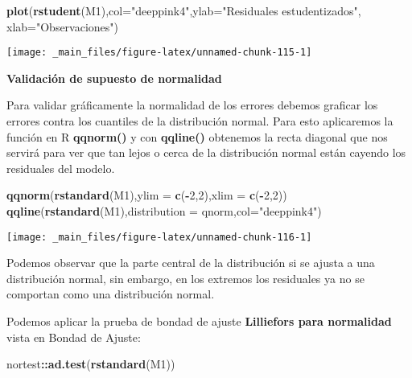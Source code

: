 \documentclass[
  a4paper,
  oneside,
  openany]{book}
\newenvironment{Shaded}{\begin{snugshade}}{\end{snugshade}}
\newcommand{\DataTypeTok}[1]{\textcolor[rgb]{0.13,0.29,0.53}{#1}}
\newcommand{\DecValTok}[1]{\textcolor[rgb]{0.00,0.00,0.81}{#1}}
\newcommand{\KeywordTok}[1]{\textcolor[rgb]{0.13,0.29,0.53}{\textbf{#1}}}
\newcommand{\NormalTok}[1]{#1}
\newcommand{\OperatorTok}[1]{\textcolor[rgb]{0.81,0.36,0.00}{\textbf{#1}}}
\newcommand{\StringTok}[1]{\textcolor[rgb]{0.31,0.60,0.02}{#1}}
\begin{document}
\begin{Shaded}
\begin{Highlighting}[]
\KeywordTok{plot}\NormalTok{(}\KeywordTok{rstudent}\NormalTok{(M1),}\DataTypeTok{col=}\StringTok{"deeppink4"}\NormalTok{,}\DataTypeTok{ylab=}\StringTok{"Residuales estudentizados"}\NormalTok{, }\DataTypeTok{xlab=}\StringTok{"Observaciones"}\NormalTok{)}
\end{Highlighting}
\end{Shaded}

\begin{center}\texttt{[image: \_main\_files/figure-latex/unnamed-chunk-115-1]} \end{center}

\textbf{Validación de supuesto de normalidad}

Para validar gráficamente la normalidad de los errores debemos graficar los errores contra los cuantiles de la distribución normal. Para esto aplicaremos la función en R \textbf{qqnorm()} y con \textbf{qqline()} obtenemos la recta diagonal que nos servirá para ver que tan lejos o cerca de la distribución normal están cayendo los residuales del modelo.

\begin{Shaded}
\begin{Highlighting}[]
\KeywordTok{qqnorm}\NormalTok{(}\KeywordTok{rstandard}\NormalTok{(M1),}\DataTypeTok{ylim =} \KeywordTok{c}\NormalTok{(}\OperatorTok{{-}}\DecValTok{2}\NormalTok{,}\DecValTok{2}\NormalTok{),}\DataTypeTok{xlim =} \KeywordTok{c}\NormalTok{(}\OperatorTok{{-}}\DecValTok{2}\NormalTok{,}\DecValTok{2}\NormalTok{))}
\KeywordTok{qqline}\NormalTok{(}\KeywordTok{rstandard}\NormalTok{(M1),}\DataTypeTok{distribution =}\NormalTok{ qnorm,}\DataTypeTok{col=}\StringTok{"deeppink4"}\NormalTok{)}
\end{Highlighting}
\end{Shaded}

\begin{center}\texttt{[image: \_main\_files/figure-latex/unnamed-chunk-116-1]} \end{center}

Podemos observar que la parte central de la distribución si se ajusta a una distribución normal, sin embargo, en los extremos los residuales ya no se comportan como una distribución normal.

Podemos aplicar la prueba de bondad de ajuste \textbf{Lilliefors para normalidad} vista en Bondad de Ajuste:

\begin{Shaded}
\begin{Highlighting}[]
\NormalTok{nortest}\OperatorTok{::}\KeywordTok{ad.test}\NormalTok{(}\KeywordTok{rstandard}\NormalTok{(M1))}
\end{Highlighting}
\end{Shaded}
\end{document}
